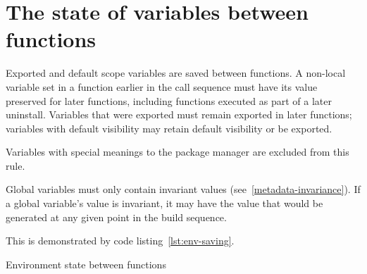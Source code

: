 \section{The state of variables between functions}
\label{ebuild-env-state}

Exported and default scope variables are saved between functions. A non-local variable set in a
function earlier in the call sequence must have its value preserved for later functions, including
functions executed as part of a later uninstall. Variables that were exported must remain exported
in later functions; variables with default visibility may retain default visibility or be exported.

Variables with special meanings to the package manager are excluded from this rule.

Global variables must only contain invariant values (see~\ref{metadata-invariance}). If a global
variable's value is invariant, it may have the value that would be generated at any given point
in the build sequence.

This is demonstrated by code listing~\ref{lst:env-saving}.

\begin{listing}
  \caption{Environment state between functions}\label{lst:env-saving}
  
\end{listing}


